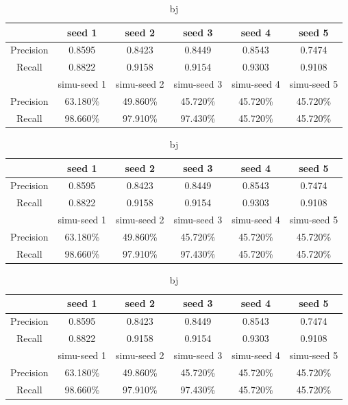 \documentclass[runningheads,a4paper]{llncs}
\begin{document}
\begin{table}
\centering
\begin{tabular}{|c|c|c|c|c|c|}
\hline
 & seed 1 & seed 2&seed 3&seed 4&seed 5 \\
\hline
Precision& 0.8595 & 0.8423 & 0.8449& 0.8543& 0.7474 \\
\hline
Recall& 0.8822 & 0.9158 & 0.9154& 0.9303& 0.9108 \\
\hline
 & simu-seed 1 & simu-seed 2&simu-seed 3&simu-seed 4&simu-seed 5 \\
 \hline
Precision& 63.180\% & 49.860\% & 45.720\%& 45.720\%& 45.720\% \\
\hline
Recall& 98.660\% & 97.910\% & 97.430\%& 45.720\%& 45.720\%  \\
\hline
\end{tabular}
\caption{bj}
\end{table} 


\begin{table}
\centering
\begin{tabular}{|c|c|c|c|c|c|}
\hline
 & seed 1 & seed 2&seed 3&seed 4&seed 5 \\
\hline
Precision& 0.8595 & 0.8423 & 0.8449& 0.8543& 0.7474 \\
\hline
Recall& 0.8822 & 0.9158 & 0.9154& 0.9303& 0.9108 \\
\hline
 & simu-seed 1 & simu-seed 2&simu-seed 3&simu-seed 4&simu-seed 5 \\
 \hline
Precision& 63.180\% & 49.860\% & 45.720\%& 45.720\%& 45.720\% \\
\hline
Recall& 98.660\% & 97.910\% & 97.430\%& 45.720\%& 45.720\%  \\
\hline
\end{tabular}
\caption{bj}
\end{table} 


\begin{table}
\centering
\begin{tabular}{|c|c|c|c|c|c|}
\hline
 & seed 1 & seed 2&seed 3&seed 4&seed 5 \\
\hline
Precision& 0.8595 & 0.8423 & 0.8449& 0.8543& 0.7474 \\
\hline
Recall& 0.8822 & 0.9158 & 0.9154& 0.9303& 0.9108 \\
\hline
 & simu-seed 1 & simu-seed 2&simu-seed 3&simu-seed 4&simu-seed 5 \\
 \hline
Precision& 63.180\% & 49.860\% & 45.720\%& 45.720\%& 45.720\% \\
\hline
Recall& 98.660\% & 97.910\% & 97.430\%& 45.720\%& 45.720\%  \\
\hline
\end{tabular}
\caption{bj}
\end{table} 
\end{document}
